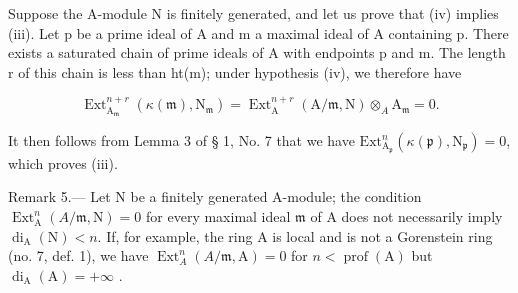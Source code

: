 Suppose the A-module N is finitely generated, and let us prove that (iv) implies (iii). Let p be a prime ideal of A and m a maximal ideal of A containing p. There exists a saturated chain of prime ideals of A with endpoints p and m. The length r of this chain is less than ht(m); under hypothesis (iv), we therefore have

\[
\operatorname{Ext} _ {\mathrm{A} _ {\mathfrak {m}}} ^ {n + r} (\kappa (\mathfrak {m}), \mathrm{N} _ {\mathfrak {m}}) = \operatorname{Ext} _ {\mathrm{A}} ^ {n + r} (\mathrm{A} / \mathfrak {m}, \mathrm{N}) \otimes_ {A} \mathrm{A} _ {\mathfrak {m}} = 0.
\]

It then follows from Lemma 3 of § 1, No. 7 that we have \(\mathrm{Ext}_{\mathrm{A}_{\mathfrak{p}}}^{n}(\kappa(\mathfrak{p}),\mathrm{N}_{\mathfrak{p}})=0\), which proves (iii).

Remark 5.— Let N be a finitely generated A-module; the condition \(\operatorname{Ext}_{\mathrm{A}}^{n}(A/\mathfrak{m},\mathrm{N})=0\) for every maximal ideal \(\mathfrak{m}\) of A does not necessarily imply \(\operatorname{di}_{\mathrm{A}}(\mathrm{N})<n\). If, for example, the ring A is local and is not a Gorenstein ring (no. 7, def. 1), we have \(\operatorname{Ext}_{A}^{n}(A/\mathfrak{m},\mathrm{A})=0\) for \(n<\operatorname{prof}(\mathrm{A})\) but \(\operatorname{di}_{\mathrm{A}}(\mathrm{A})=+\infty\) .

